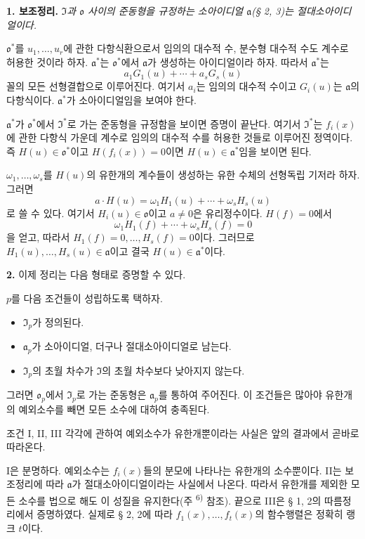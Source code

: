 \textbf{1. 보조정리.}
\emph{\(\mathfrak I\)과 \(\mathfrak o\) 사이의 준동형을 규정하는 소아이디얼 \(\mathfrak a\)(§ 2, 3)는 절대소아이디얼이다.}

\(\mathfrak o^*\)를 \(u_1,\ldots,u_r\)에 관한 다항식환으로서 임의의 대수적 수, 분수형 대수적 수도 계수로 허용한 것이라 하자. \(\mathfrak a^*\)는 \(\mathfrak o^*\)에서 \(\mathfrak a\)가 생성하는 아이디얼이라 하자. 따라서 \(\mathfrak a^*\)는
\[
a_1G_1(u)+\cdots+a_sG_s(u)
\]
꼴의 모든 선형결합으로 이루어진다. 여기서 \(a_i\)는 임의의 대수적 수이고 \(G_i(u)\)는 \(\mathfrak a\)의 다항식이다. \(\mathfrak a^*\)가 소아이디얼임을 보여야 한다.

\(\mathfrak a^*\)가 \(\mathfrak o^*\)에서 \(\mathfrak I^*\)로 가는 준동형을 규정함을 보이면 증명이 끝난다. 여기서 \(\mathfrak I^*\)는 \(f_i(x)\)에 관한 다항식 가운데 계수로 임의의 대수적 수를 허용한 것들로 이루어진 정역이다. 즉 \(H(u)\in\mathfrak o^*\)이고 \(H(f_i(x))=0\)이면 \(H(u)\in\mathfrak a^*\)임을 보이면 된다.

\(\omega_1,\ldots,\omega_s\)를 \(H(u)\)의 유한개의 계수들이 생성하는 유한 수체의 선형독립 기저라 하자. 그러면
\[
a\cdot H(u)=\omega_1H_1(u)+\cdots+\omega_sH_s(u)
\]
로 쓸 수 있다. 여기서 \(H_i(u)\in\mathfrak o\)이고 \(a\ne0\)은 유리정수이다. \(H(f)=0\)에서
\[
\omega_1H_1(f)+\cdots+\omega_sH_s(f)=0
\]
을 얻고, 따라서 \(H_1(f)=0,\ldots,H_s(f)=0\)이다. 그러므로 \(H_1(u),\ldots,H_s(u)\in\mathfrak a\)이고 결국 \(H(u)\in\mathfrak a^*\)이다.

\textbf{2.}
이제 정리는 다음 형태로 증명할 수 있다.

\(p\)를 다음 조건들이 성립하도록 택하자.
\begin{itemize}
\item[I.] \(\mathfrak I_p\)가 정의된다.
\item[II.] \(\mathfrak a_p\)가 소아이디얼, 더구나 절대소아이디얼로 남는다.
\item[III.] \(\mathfrak I_p\)의 초월 차수가 \(\mathfrak I\)의 초월 차수보다 낮아지지 않는다.
\end{itemize}
그러면 \(\mathfrak o_p\)에서 \(\mathfrak I_p\)로 가는 준동형은 \(\mathfrak a_p\)를 통하여 주어진다. 이 조건들은 많아야 유한개의 예외소수를 빼면 모든 소수에 대하여 충족된다.

조건 I, II, III 각각에 관하여 예외소수가 유한개뿐이라는 사실은 앞의 결과에서 곧바로 따라온다.

I은 분명하다. 예외소수는 \(f_i(x)\)들의 분모에 나타나는 유한개의 소수뿐이다. II는 보조정리에 따라 \(\mathfrak a\)가 절대소아이디얼이라는 사실에서 나온다. 따라서 유한개를 제외한 모든 소수를 법으로 해도 이 성질을 유지한다(주 \textsuperscript{6)} 참조). 끝으로 III은 § 1, 2의 따름정리에서 증명하였다. 실제로 § 2, 2에 따라 \(f_1(x),\ldots,f_t(x)\)의 함수행렬은 정확히 랭크 \(t\)이다.


